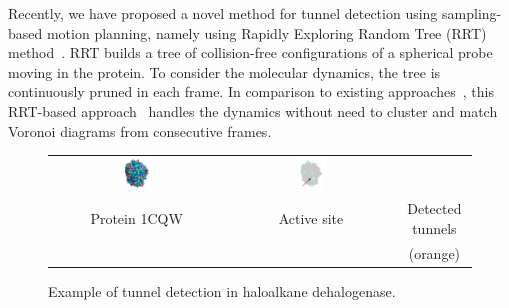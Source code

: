 \documentclass{llncs}
\begin{document}
Recently, we have proposed a novel method for tunnel detection using sampling-based motion planning, namely using Rapidly Exploring Random Tree (RRT) method~\cite{vonasek2016application}.
RRT builds a tree of collision-free configurations of a spherical probe moving in the protein. 
To consider the molecular dynamics, the tree is continuously pruned in each frame.
In comparison to existing approaches~\cite{Petrek20071357,citeulike:6257975}, this RRT-based approach~\cite{vonasek2016application} 
handles the dynamics without need to cluster and match Voronoi diagrams from consecutive frames.


\begin{figure}[t]
\centering
{\footnotesize
\renewcommand{\arraystretch}{0.1}
\renewcommand{\tabcolsep}{0pt}
\begin{tabular}{ccc}
\includegraphics[width=0.15\textwidth]{fig/motiv1} &
\includegraphics[width=0.17\textwidth]{fig/motiv2lab} \\
Protein 1CQW & Active site & Detected tunnels \\
             &            & (orange)
\end{tabular}
}
\caption{\label{fig::motiv}
    Example of tunnel detection in haloalkane dehalogenase.
}
\end{figure}
\end{document}
